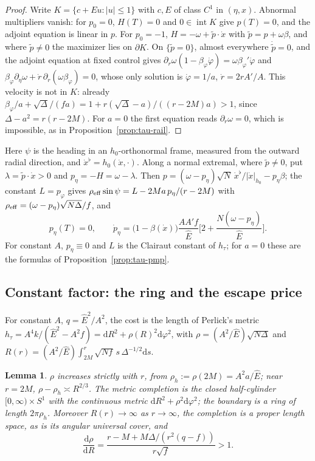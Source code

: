 \documentclass[aip,jmp,amsmath,amssymb,reprint]{revtex4-2}
\newcommand{\Ehat}{\hat E}
\newcommand{\dd}{\mathrm{d}}
\theoremstyle{plain}
\newtheorem{lemma}[proposition]{Lemma}
\theoremstyle{definition}
\begin{document}
\begin{proof}
Write $K=\{c+Eu:|u|\le1\}$ with $c,E$ of class $C^1$ in $(\eta,x)$. Abnormal multipliers vanish:
for $p_0=0$, $H(T)=0$ and $0\in\operatorname{int}K$ give $p(T)=0$, and the adjoint equation is linear
in $p$. For $p_0=-1$, $H=-\omega+\tilde p\cdot\dot x$ with $\tilde p=p+\omega\beta$, and where $\tilde p\ne0$ the
maximizer lies on $\partial K$. On $\{\tilde p=0\}$, almost everywhere $\dot{\tilde p}=0$, and the adjoint
equation at fixed control gives $\partial_r\omega(1-\beta_\varphi\dot\varphi)=\omega\beta_\varphi'\dot\varphi$ and
$\beta_\varphi\partial_\eta\omega+\dot r\,\partial_r(\omega\beta_\varphi)=0$, whose only solution is
$\dot\varphi=1/a$, $\dot r=2rA'/A$. This velocity is not in $K$: already
$\beta_\varphi/a+\sqrt\Delta/(fa)=1+r(\sqrt\Delta-a)/((r-2M)a)>1$, since $\Delta-a^2=r(r-2M)$. For $a=0$ the first
equation reads $\partial_r\omega=0$, which is impossible, as in Proposition~\ref{prop:tau-rail}.
\end{proof}

Here $\psi$ is the heading in an $h_0$-orthonormal frame, measured from the outward radial
direction, and $\dot x^\flat=h_0(\dot x,\cdot)$. Along a normal extremal, where $\tilde p\ne0$, put $\lambda=\tilde p\cdot\dot x>0$ and $p_\eta=-H=\omega-\lambda$.
Then $p=(\omega-p_\eta)\sqrt N\,\dot x^\flat/|\dot x|_{h_0}-p_\eta\beta$; the constant $L=p_\varphi$ gives
$\rho_{\rm eff}\sin\psi=L-2Ma\,p_\eta/(r-2M)$ with $\rho_{\rm eff}=(\omega-p_\eta)\sqrt{N\Delta}/f$, and
\[
  p_\eta(T)=0,\qquad
  \dot p_\eta=\bigl(1-\beta(\dot x)\bigr)\frac{AA'f}{\Ehat}\Big[2+\frac{N(\omega-p_\eta)}{\Ehat}\Big].
\]
For constant $A$, $p_\eta\equiv0$ and $L$ is the Clairaut constant of $h_\tau$; for $a=0$ these are
the formulas of Proposition~\ref{prop:tau-pmp}.

\subsection{Constant factor: the ring and the escape price}
For constant $A$, $q=\Ehat^2/A^2$, the cost is the length of Perlick's metric
$h_\tau=A^4k/(\Ehat^2-A^2f)=\dd R^2+\rho(R)^2\dd\varphi^2$, with $\rho=(A^2/\Ehat)\sqrt{N\Delta}$ and
$R(r)=(A^2/\Ehat)\int_{2M}^r\sqrt{Nf}\,s\,\Delta^{-1/2}\dd s$.

\begin{lemma}\label{lem:tau-eq-ring}
$\rho$ increases strictly with $r$, from $\rho_h:=\rho(2M)=A^2a/\Ehat$; near $r=2M$,
$\rho-\rho_h\asymp R^{2/3}$. The metric completion is the closed half-cylinder $[0,\infty)\times S^1$
with the continuous metric $\dd R^2+\rho^2\dd\varphi^2$; the boundary is a ring of length $2\pi\rho_h$.
Moreover $R(r)\to\infty$ as $r\to\infty$, the completion is a proper length space, as is its angular
universal cover, and
\[
  \frac{\dd\rho}{\dd R}=\frac{r-M+M\Delta/(r^2(q-f))}{r\sqrt f}>1 .
\]
\end{lemma}
\end{document}
